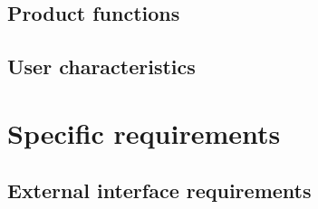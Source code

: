 \documentclass[12pt, a4paper]{report}
\begin{document}
%

\section{Product functions}


\section{User characteristics}


%

%

%

\chapter{Specific requirements}
\label{ch:requirements}

\section{External interface requirements}


%

%

%

%

%

%
\end{document}

